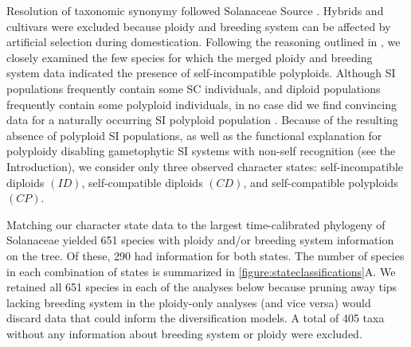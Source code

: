 Resolution of taxonomic synonymy followed Solanaceae Source \citep{solsource}. 
Hybrids and cultivars were excluded because ploidy and breeding system can be affected by artificial selection during domestication.
Following the reasoning outlined in \citet{robertson_2011}, we closely examined the few species for which the merged ploidy and breeding system data indicated the presence of self-incompatible polyploids.
Although SI populations frequently contain some SC individuals, and diploid populations frequently contain some polyploid individuals, in no case did we find convincing data for a naturally occurring SI polyploid population  \citep[discussed in][]{robertson_2011}.
Because of the resulting absence of polyploid SI populations, as well as the functional explanation for polyploidy disabling gametophytic SI systems with non-self recognition (see the Introduction), we consider only three observed character states: self-incompatible diploids $(ID)$, self-compatible diploids $(CD)$, and self-compatible polyploids $(CP)$.

Matching our character state data to the largest time-calibrated phylogeny of Solanaceae \citep{sarkinen_2013} yielded 651 species with ploidy and/or breeding system information on the tree.
Of these, 290 had information for both states.
The number of species in each combination of states is summarized in \cref{figure:stateclassifications}A.
We retained all 651 species in each of the analyses below because pruning away tips lacking breeding system in the ploidy-only analyses (and vice versa) would discard data that could inform the diversification models.
A total of 405 taxa without any information about breeding system or ploidy were excluded.

